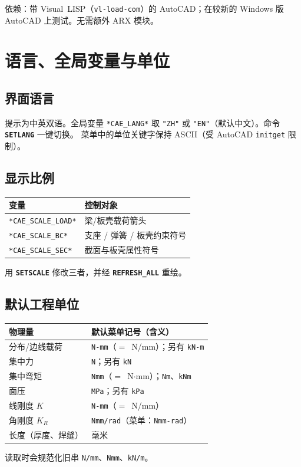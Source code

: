 \documentclass[a4paper]{ltxdoc}
\newcommand{\cadcmd}[1]{\texttt{\textbf{#1}}}
\newcommand{\caevar}[1]{\texttt{#1}}
\begin{document}
依赖：带 Visual~LISP（\texttt{vl-load-com}）的 AutoCAD；在较新的
Windows 版 AutoCAD 上测试。无需额外 ARX 模块。

\section{语言、全局变量与单位}

\subsection{界面语言}
提示为中英双语。全局变量 \caevar{*CAE\_LANG*} 取 \texttt{"ZH"} 或
\texttt{"EN"}（默认中文）。命令 \cadcmd{SETLANG} 一键切换。
菜单中的单位关键字保持 ASCII（受 AutoCAD \texttt{initget} 限制）。

\subsection{显示比例}
\begin{center}
\begin{tabular}{@{}ll@{}}
\toprule
变量 & 控制对象 \\
\midrule
\caevar{*CAE\_SCALE\_LOAD*} & 梁/板壳载荷箭头 \\
\caevar{*CAE\_SCALE\_BC*}   & 支座 / 弹簧 / 板壳约束符号 \\
\caevar{*CAE\_SCALE\_SEC*}  & 截面与板壳属性符号 \\
\bottomrule
\end{tabular}
\end{center}
用 \cadcmd{SETSCALE} 修改三者，并经 \cadcmd{REFRESH\_ALL} 重绘。

\subsection{默认工程单位}
\begin{center}
\begin{tabular}{@{}ll@{}}
\toprule
物理量 & 默认菜单记号（含义） \\
\midrule
分布/边线载荷 & \texttt{N-mm}（$=$~N/mm）；另有 \texttt{kN-m} \\
集中力       & \texttt{N}；另有 \texttt{kN} \\
集中弯矩     & \texttt{Nmm}（$=$~N$\cdot$mm）；\texttt{Nm}、\texttt{kNm} \\
面压         & \texttt{MPa}；另有 \texttt{kPa} \\
线刚度 $K$   & \texttt{N-mm}（$=$~N/mm） \\
角刚度 $K_R$ & \texttt{Nmm/rad}（菜单：\texttt{Nmm-rad}） \\
长度（厚度、焊缝） & 毫米 \\
\bottomrule
\end{tabular}
\end{center}
读取时会规范化旧串 \texttt{N/mm}、\texttt{Nmm}、\texttt{kN/m}。
\end{document}
